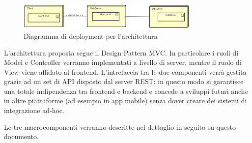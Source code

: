 \begin{figure}[h]
\centering
\includegraphics[width=0.8\textwidth]{res/sections/GeneralArchitecture.png}
\caption{Diagramma di deployment per l'architettura}
\end{figure}

L'architettura proposta segue il Design Pattern MVC. In particolare i ruoli di Model e Controller verranno implementati a livello di server, mentre il ruolo di View viene affidato al frontend.
L'intrefaccia tra le due componenti verrà gestita grazie ad un set di API disposto dal server REST: in questo modo si garantisce una totale indipendenza tra frontend e backend e concede a sviluppi futuri anche in altre piattaforme (ad esempio in app mobile) senza dover creare dei sistemi di integrazione ad-hoc.

Le tre macrocomponenti verranno descritte nel dettaglio in seguito su questo documento.

